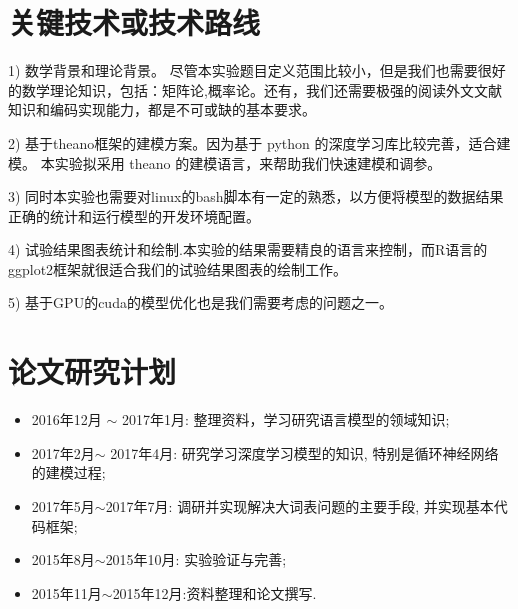 \documentclass[12pt,a4paper]{article}
\begin{document}
\section{关键技术或技术路线}
1) 数学背景和理论背景。 尽管本实验题目定义范围比较小，但是我们也需要很好的数学理论知识，包括：矩阵论,概率论。还有，我们还需要极强的阅读外文文献知识和编码实现能力，都是不可或缺的基本要求。

2) 基于theano框架的建模方案。因为基于 python 的深度学习库比较完善，适合建模。 本实验拟采用 theano 的建模语言，来帮助我们快速建模和调参。

3) 同时本实验也需要对linux的bash脚本有一定的熟悉，以方便将模型的数据结果正确的统计和运行模型的开发环境配置。

4) 试验结果图表统计和绘制.本实验的结果需要精良的语言来控制，而R语言的ggplot2框架就很适合我们的试验结果图表的绘制工作。

5) 基于GPU的cuda的模型优化也是我们需要考虑的问题之一。
\section{论文研究计划}
\begin{itemize}
  \item 2016年12月 $\sim$ 2017年1月: 整理资料，学习研究语言模型的领域知识;
  \item 2017年2月$\sim$ 2017年4月: 研究学习深度学习模型的知识, 特别是循环神经网络的建模过程;
  \item 2017年5月$\sim$2017年7月: 调研并实现解决大词表问题的主要手段, 并实现基本代码框架;
  \item 2015年8月$\sim$2015年10月: 实验验证与完善;
  \item 2015年11月$\sim$2015年12月:资料整理和论文撰写.
\end{itemize}

\newpage
{}

\end{document}
